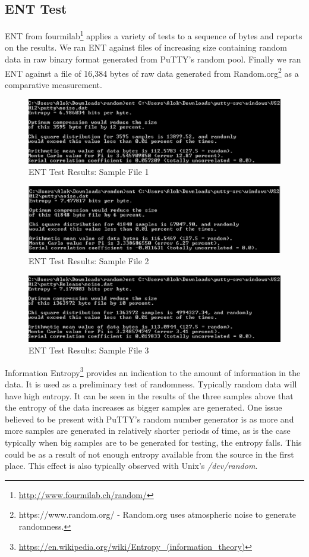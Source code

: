 \documentclass{bhamthesis}
\begin{document}
\subsection{ENT Test}
ENT from fourmilab\footnote{\url{http://www.fourmilab.ch/random/}} applies a variety of tests to a sequence of bytes and reports on the results. We ran ENT against files of increasing size containing random data in raw binary format generated from PuTTY's random pool. Finally we ran ENT against a file of 16,384 bytes of raw data generated from Random.org\footnote{https://www.random.org/ - Random.org uses atmospheric noise to generate randomness.} as a comparative measurement.\par
\begin{figure}[ht]
\caption{ENT Test Results: Sample File 1}
\centering
\includegraphics[width=1\textwidth]{ENT-Test1.png}
\end{figure}
\clearpage
\begin{figure}[ht]
\caption{ENT Test Results: Sample File 2}
\centering
\includegraphics[width=1\textwidth]{ENT-Test2.png}
\end{figure}
\begin{figure}[ht]
\caption{ENT Test Results: Sample File 3}
\centering
\includegraphics[width=1\textwidth]{ENT-Test3.png}
\end{figure}
Information Entropy\footnote{\url{https://en.wikipedia.org/wiki/Entropy_(information_theory)}} provides an indication to the amount of information in the data. It is used as a preliminary test of randomness. Typically random data will have high entropy. It can be seen in the results of the three samples above that the entropy of the data increases as bigger samples are generated. One issue believed to be present with PuTTY's random number generator is as more and more samples are generated in relatively shorter periods of time, as is the case typically when big samples are to be generated for testing, the entropy falls. This could be as a result of not enough entropy available from the source in the first place. This effect is also typically observed with Unix's \textit{/dev/random}.\par
\end{document}
